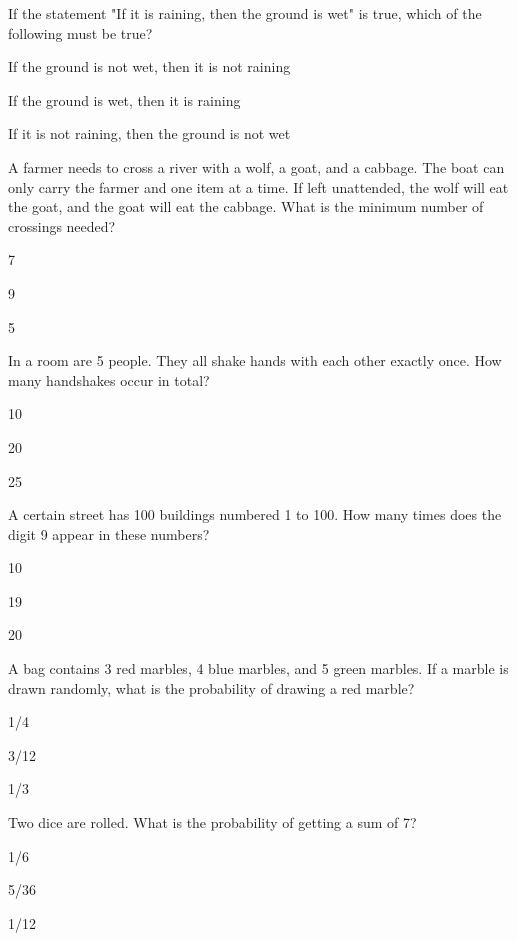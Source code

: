 \begin{enhancedmcq}{If the statement "If it is raining, then the ground is wet" is true, which of the following must be true?}
\item If the ground is not wet, then it is not raining
\item If the ground is wet, then it is raining
\item If it is not raining, then the ground is not wet

\end{enhancedmcq}
\begin{enhancedmcq}{A farmer needs to cross a river with a wolf, a goat, and a cabbage. The boat can only carry the farmer and one item at a time. If left unattended, the wolf will eat the goat, and the goat will eat the cabbage. What is the minimum number of crossings needed?}
\item 7
\item 9
\item 5

\end{enhancedmcq}
\begin{enhancedmcq}{In a room are 5 people. They all shake hands with each other exactly once. How many handshakes occur in total?}
\item 10
\item 20
\item 25

\end{enhancedmcq}
\begin{enhancedmcq}{A certain street has 100 buildings numbered 1 to 100. How many times does the digit 9 appear in these numbers?}
\item 10
\item 19
\item 20

\end{enhancedmcq}
\begin{enhancedmcq}{A bag contains 3 red marbles, 4 blue marbles, and 5 green marbles. If a marble is drawn randomly, what is the probability of drawing a red marble?}
\item 1/4
\item 3/12
\item 1/3

\end{enhancedmcq}
\begin{enhancedmcq}{Two dice are rolled. What is the probability of getting a sum of 7?}
\item 1/6
\item 5/36
\item 1/12

\end{enhancedmcq}
